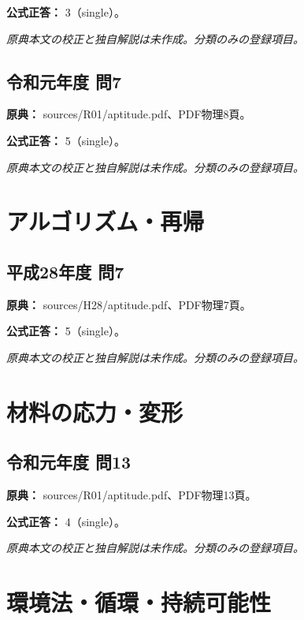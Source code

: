 \textbf{公式正答：} 3（single）。

\par\textit{原典本文の校正と独自解説は未作成。分類のみの登録項目。}

\subsection{令和元年度 問7}
\label{q:r01-reg-apt-07}

\noindent\textbf{原典：} sources/R01/aptitude.pdf、PDF物理8頁。

\textbf{公式正答：} 5（single）。

\par\textit{原典本文の校正と独自解説は未作成。分類のみの登録項目。}

\section{アルゴリズム・再帰}

\subsection{平成28年度 問7}
\label{q:h28-reg-apt-07}

\noindent\textbf{原典：} sources/H28/aptitude.pdf、PDF物理7頁。

\textbf{公式正答：} 5（single）。

\par\textit{原典本文の校正と独自解説は未作成。分類のみの登録項目。}

\section{材料の応力・変形}

\subsection{令和元年度 問13}
\label{q:r01-reg-apt-13}

\noindent\textbf{原典：} sources/R01/aptitude.pdf、PDF物理13頁。

\textbf{公式正答：} 4（single）。

\par\textit{原典本文の校正と独自解説は未作成。分類のみの登録項目。}

\section{環境法・循環・持続可能性}

